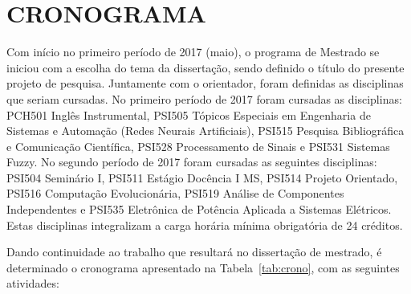 \chapter{CRONOGRAMA}
\label{cap:crono}

Com início no primeiro período de 2017 (maio), o programa de Mestrado se iniciou com a escolha do tema da dissertação, sendo definido o título do presente projeto de pesquisa. Juntamente com o orientador, foram definidas as disciplinas que seriam cursadas. No primeiro período de 2017 foram cursadas as disciplinas: PCH501 Inglês Instrumental, PSI505 Tópicos Especiais em Engenharia de Sistemas e Automação (Redes Neurais Artificiais), PSI515 Pesquisa Bibliográfica e Comunicação Científica, PSI528 Processamento de Sinais e PSI531 Sistemas Fuzzy. No segundo período de 2017 foram cursadas as seguintes disciplinas: PSI504 Seminário I, PSI511 Estágio Docência I MS, PSI514 Projeto Orientado, PSI516 Computação Evolucionária, PSI519 Análise de Componentes Independentes e PSI535 Eletrônica de Potência Aplicada a Sistemas Elétricos. Estas disciplinas integralizam a carga horária mínima obrigatória de 24 créditos. 

Dando continuidade ao trabalho que resultará no dissertação de mestrado, é determinado o cronograma apresentado na Tabela~\ref{tab:crono}, com as seguintes atividades:

